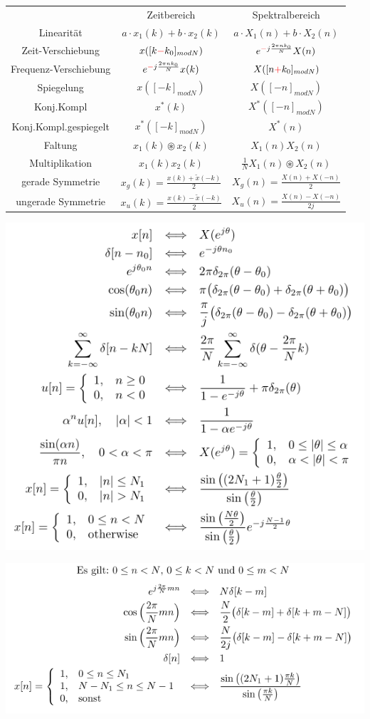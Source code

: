 \documentclass[10pt,a4paper]{article}
\begin{document}
\begin{center}
\begin{tabular}{ | c | c | c | }
\cline{1-3}
        & Zeitbereich & Spektralbereich \\
\cline{1-3}
        Linearität & $a\cdot x_1(k)+ b\cdot x_2(k)$ & $a\cdot X_1(n) +b\cdot X_2(n)$ \\
\cline{1-3}
        Zeit-Verschiebung & $x([k\textcolor{red}{-}k_0]_{modN})$ & $e^{\textcolor{red}{-}j\frac{2\pi nk_0}{N}} X(n)$\\
\cline{1-3}
        Frequenz-Verschiebung & $e^{\textcolor{red}{-}j\frac{2\pi nk_0}{N}} x(k)$ & $X([n\textcolor{red}{+}k_0]_{modN})$ \\  
\cline{1-3}
        Spiegelung & $x([-k]_{modN})$ & $X([-n]_{modN})$ \\  
\cline{1-3}
        Konj.Kompl & $x^*(k)$& $X^*([-n]_{modN})$\\ 
\cline{1-3}
        Konj.Kompl.gespiegelt & $x^*([-k]_{modN})$& $X^*(n)$\\ 
\cline{1-3}
        Faltung & $x_1(k) \circledast x_2(k)$ & $X_1(n)X_2(n)$ \\  
\cline{1-3}
        Multiplikation & $x_1(k)x_2(k)$ & $\frac{1}{N} X_1(n) \circledast X_2(n)$ \\
\cline{1-3}
        gerade Symmetrie & $x_g(k)=\frac{x(k)+\tilde{x}(-k)}{2}$ & $X_g(n)=\frac{X(n)+X(-n)}{2}$ \\
\cline{1-3}
        ungerade Symmetrie & $x_u(k)=\frac{x(k)-\tilde{x}(-k)}{2}$ & $X_u(n)=\frac{X(n)-X(-n)}{2j}$ \\
\cline{1-3}
\end{tabular}
\end{center}
\normalsize
  \begin{center}
      \includegraphics[width=.35\textwidth]{./img/dtft.png}
  \end{center}
  \begin{center}
      \includegraphics[width=.35\textwidth]{./img/dft.png}
  \end{center}
\end{document}
